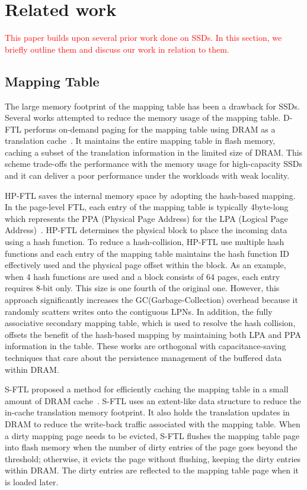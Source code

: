 \section{Related work}
\textcolor{red}{This paper builds upon several prior work done on SSDs. In this section, we briefly outline them and discuss our work in relation to them.}

\subsection{Mapping Table}
The large memory footprint of the mapping table has been a drawback for SSDs.
Several works attempted to reduce the memory usage of the mapping table. 
D-FTL performs on-demand paging for the mapping table using DRAM as a translation cache~\cite{gupta2009dftl}.
It maintains the entire mapping table in flash memory, caching a subset of the translation information in the limited size of DRAM.
This scheme trade-offs the performance with the memory usage for high-capacity SSDs and it can deliver a poor performance under the workloads with weak locality. 

HP-FTL saves the internal memory space by adopting the hash-based mapping. In the page-level FTL, each entry of the mapping table is typically 4byte-long which represents the PPA (Physical Page Address) for the LPA (Logical Page Address)~\cite{ni2017hash}. 
HP-FTL determines the physical block to place the incoming data using a hash function. To reduce a hash-collision, HP-FTL use multiple hash functions and each entry of the mapping table maintains the hash function ID effectively used and the physical page offset within the block. As an example, when 4 hash functions are used and a block consists of 64 pages, each entry requires 8-bit only. This size is one fourth of the original one. However, this approach significantly increases the GC(Garbage-Collection) overhead because it randomly scatters writes onto the contiguous LPNs. 
In addition, the fully associative secondary mapping table, which is used to resolve the hash collision, offsets the benefit of the hash-based mapping by maintaining both LPA and PPA information in the table. 
These works are orthogonal with capacitance-saving techniques that care about the persistence management of the buffered data within DRAM.

S-FTL proposed a method for efficiently caching the mapping table in a small amount of DRAM cache~\cite{jiang2011s}. S-FTL uses an extent-like data structure to reduce the in-cache translation memory footprint. It also holds the translation updates in DRAM to reduce the write-back traffic associated with the mapping table. When a dirty mapping page needs to be evicted, S-FTL flushes the mapping table page into flash memory when the number of dirty entries of the page goes beyond the threshold; otherwise, it evicts the page without flushing, keeping the dirty entries within DRAM. The dirty entries are reflected to the mapping table page when it is loaded later. 

